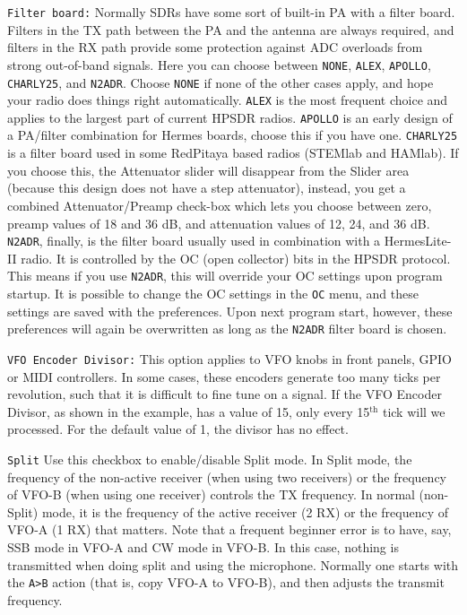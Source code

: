 \documentclass[12pt]{book}
\def\rett#1{\texttt{\color{red}#1}}
\def\bltt#1{\texttt{\color{blue}#1}}
\begin{document}
\rett{Filter board:} Normally SDRs have some sort of built-in PA with a filter board. Filters in the TX path
between the PA and the antenna are always required, and filters in the RX path provide some protection
against ADC overloads from strong out-of-band signals. Here you can choose between \texttt{NONE},
\texttt{ALEX},
\texttt{APOLLO}, \texttt{CHARLY25}, and \texttt{N2ADR}. Choose \texttt{NONE} if none of the other cases
apply, and hope your radio does things right automatically. \texttt{ALEX} is the most frequent choice
and applies to the largest part of current HPSDR radios. \texttt{APOLLO} is an early design of a
PA/filter combination for Hermes boards, choose this if you have one. \texttt{CHARLY25} is a filter board
used in some RedPitaya based radios (STEMlab and HAMlab). If you choose this, the Attenuator slider will
disappear from the Slider area (because this design does not have a step attenuator), instead, you get
a combined Attenuator/Preamp check-box which lets you choose between zero, preamp values of 18 and 36 dB,
and attenuation values of 12, 24, and 36 dB. \texttt{N2ADR}, finally, is the filter board usually used
in combination with a HermesLite-II radio. It is controlled by the OC (open collector) bits in the HPSDR
protocol. This means if you use \texttt{N2ADR}, this will override your OC settings upon program startup.
It is possible to change the OC settings in the \bltt{OC} menu, and these settings are saved with the
preferences. Upon next program start, however, these preferences will again be overwritten as long
as the \texttt{N2ADR} filter board is chosen.

\rett{VFO Encoder Divisor:} This option applies to VFO knobs in front panels, GPIO
or MIDI controllers. In some cases, these encoders generate too many ticks per revolution,
such that it is difficult to fine tune on a signal.
If the VFO Encoder Divisor, as shown in the example, has a value of
15, only every 15$^\textrm{th}$ tick will we processed. For the default value of 1,
the divisor has no effect.

\rett{Split} Use this checkbox to enable/disable Split mode. In Split mode, the frequency of
the non-active receiver (when using two receivers) or the frequency of VFO-B (when using one
receiver) controls the TX frequency. In normal (non-Split) mode, it is the frequency of
the active receiver (2 RX) or the frequency of VFO-A (1 RX) that matters.
Note that a frequent beginner error is to have, say,
SSB mode in VFO-A and CW mode in VFO-B. In this case, nothing is
transmitted when doing split and using the microphone. Normally one
starts with the \bltt{A>B} action (that is, copy VFO-A to VFO-B), and
then adjusts the transmit frequency.
\end{document}
